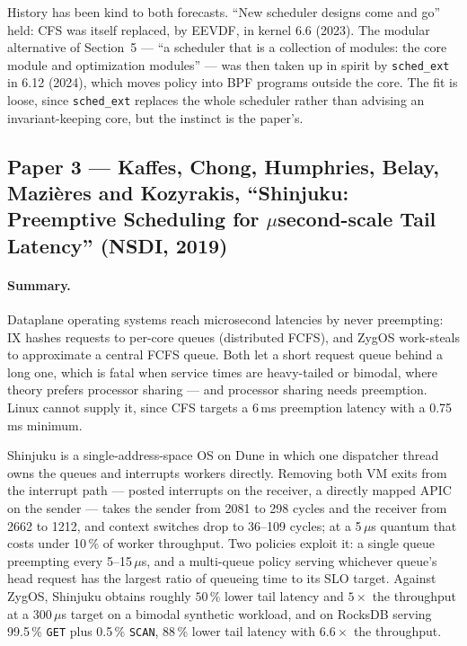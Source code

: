 History has been kind to both forecasts. ``New scheduler designs come and go'' held:
CFS was itself replaced, by EEVDF, in kernel 6.6 (2023). The modular alternative of
Section~5 --- ``a scheduler that is a collection of modules: the core module and
optimization modules'' --- was then taken up in spirit by \texttt{sched\_ext} in 6.12
(2024), which moves policy into BPF programs outside the core. The fit is loose, since
\texttt{sched\_ext} replaces the whole scheduler rather than advising an
invariant-keeping core, but the instinct is the paper's.

\subsection*{Paper 3 --- Kaffes, Chong, Humphries, Belay, Mazi\`eres and Kozyrakis,
``Shinjuku: Preemptive Scheduling for $\mu$second-scale Tail Latency'' (NSDI, 2019)}

\paragraph{Summary.}
Dataplane operating systems reach microsecond latencies by never preempting: IX hashes
requests to per-core queues (distributed FCFS), and ZygOS work-steals to approximate a
central FCFS queue. Both let a short request queue behind a long one, which is fatal
when service times are heavy-tailed or bimodal, where theory prefers processor sharing
--- and processor sharing needs preemption. Linux cannot supply it, since CFS targets a
6\,ms preemption latency with a 0.75\,ms minimum.

Shinjuku is a single-address-space OS on Dune in which one dispatcher thread owns the
queues and interrupts workers directly. Removing both VM exits from the interrupt path
--- posted
interrupts on the receiver, a directly mapped APIC on the sender --- takes the sender
from 2081 to 298 cycles and the receiver from 2662 to 1212, and context switches drop to
36--109 cycles; at a 5\,$\mu$s quantum that costs under 10\,\% of worker throughput.
Two policies exploit it: a single queue preempting every 5--15\,$\mu$s, and a
multi-queue policy serving whichever queue's head request has the largest ratio of
queueing time to its SLO target. Against ZygOS, Shinjuku obtains roughly $50\,\%$ lower
tail latency and $5\times$ the throughput at a 300\,$\mu$s target on a bimodal synthetic
workload, and on RocksDB serving 99.5\,\% \texttt{GET} plus 0.5\,\% \texttt{SCAN},
$88\,\%$ lower tail latency with $6.6\times$ the throughput.

